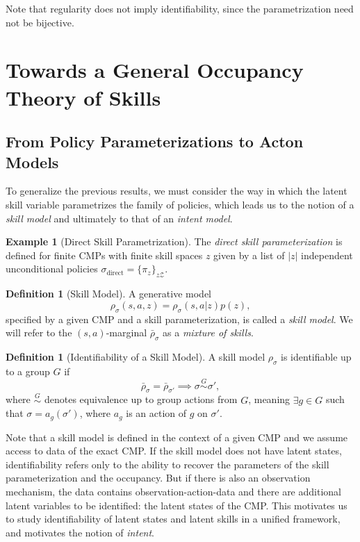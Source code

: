 \documentclass{article}
\theoremstyle{plain}
\theoremstyle{definition}
\newtheorem{definition}[theorem]{Definition}
\newtheorem{example}[theorem]{Example}
\theoremstyle{remark}
\begin{document}
Note that regularity does not imply identifiability, since the parametrization need not be bijective.

\section{Towards a General Occupancy Theory of Skills}

\subsection{From Policy Parameterizations to Acton Models}
To generalize the previous results, we must consider the way in which the latent skill variable parametrizes the family of policies, which leads us to the notion of a \emph{skill model} and ultimately to that of an \emph{intent model}.

\begin{example}[Direct Skill Parametrization]
    The \emph{direct skill parameterization} is defined for finite CMPs with finite skill spaces $z$ given by a list of $|z|$ independent unconditional policies $\sigma_\text{direct} =\{\pi_z\}_{z \mathcal{Z}}$.
\end{example}

\begin{definition}[Skill Model]
A generative model
    \begin{equation}
        \rho_\sigma(s,a,z) = \rho_\sigma(s,a|z)p(z),
    \end{equation}
specified by a given CMP and a skill parameterization, is called a \emph{skill model}. We will refer to the $(s,a)$-marginal $\bar\rho_\sigma$ as a \emph{mixture of skills}.
\end{definition}

\begin{definition}[Identifiability of a Skill Model]\label{def:identifiability-skill-model}
    A skill model $\rho_\sigma$ is identifiable up to a group $G$ if 
    $$\bar\rho_\sigma=\bar\rho_{\sigma'} \implies \sigma\overset{G}{\sim}\sigma',$$ 
    where $\overset{G}{\sim}$ denotes equivalence up to group actions from $G$, meaning $\exists g\in G$ such that $\sigma=a_g(\sigma')$, where $a_g$ is an action of $g$ on $\sigma'$.
\end{definition}

Note that a skill model is defined in the context of a given CMP and we assume access to data of the exact CMP. If the skill model does not have latent states, identifiability refers only to the ability to recover the parameters of the skill parameterization and the occupancy. But if there is also an observation mechanism, the data contains observation-action-data and there are additional latent variables to be identified: the latent states of the CMP. This motivates us to study identifiability of latent states and latent skills in a unified framework, and motivates the notion of \emph{intent}.
\end{document}

